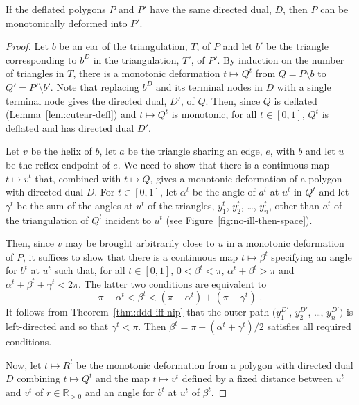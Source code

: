 \documentclass{amsart}
\newcommand{\R}[0]{\mathds{R}}
\begin{document}

\begin{theorem}
  \label{thm:defl-dd-eq}
  If the deflated polygons $P$ and $P'$ have the same directed dual,
  $D$, then $P$ can be monotonically deformed into $P'$.
\end{theorem}
\begin{proof}
  Let $b$ be an ear of the triangulation, $T$, of $P$ and let $b'$ be
  the triangle corresponding to $b^D$ in the triangulation, $T'$, of
  $P'$.  By induction on the number of triangles in $T$, there is a
  monotonic deformation $t\mapsto Q^t$ from $Q = P\setminus b$ to $Q'
  = P'\setminus b'$.  Note that replacing $b^D$ and its terminal nodes
  in $D$ with a single terminal node gives the directed dual, $D'$, of
  $Q$.  Then, since $Q$ is deflated (Lemma~\ref{lem:cutear-defl}) and
  $t\mapsto Q^t$ is monotonic, for all $t\in [0,1]$, $Q^t$ is deflated
  and has directed dual $D'$.
  
  Let $v$ be the helix of $b$, let $a$ be the triangle sharing an
  edge, $e$, with $b$ and let $u$ be the reflex endpoint of $e$.  We
  need to show that there is a continuous map $t\mapsto v^t$ that,
  combined with $t\mapsto Q$, gives a monotonic deformation of a
  polygon with directed dual $D$.  For $t\in [0,1]$, let $\alpha^t$ be
  the angle of $a^t$ at $u^t$ in $Q^t$ and let $\gamma^t$ be the sum
  of the angles at $u^t$ of the triangles, $y_1^t$, $y_2^t$, \ldots,
  $y_n^t$, other than $a^t$ of the triangulation of $Q^t$ incident to
  $u^t$ (see Figure~\ref{fig:no-ill-then-space}).
  
  Then, since $v$ may be brought arbitrarily close to $u$ in a
  monotonic deformation of $P$, it suffices to show that there is a
  continuous map $t\mapsto \beta^t$ specifying an angle for $b^t$ at
  $u^t$ such that, for all $t\in [0,1]$, $0 < \beta^t < \pi$,
  $\alpha^t + \beta^t > \pi$ and $\alpha^t + \beta^t + \gamma^t <
  2\pi$.  The latter two conditions are equivalent to
  \[
    \pi - \alpha^t < \beta^t < (\pi - \alpha^t) + (\pi - \gamma^t)\;.
  \]
  It follows from Theorem~\ref{thm:ddd-iff-nip} that the outer path
  $(y_1^{D'}$, $y_2^{D'}$, \ldots, $y_n^{D'})$ is left-directed and so
  that $\gamma^t < \pi$.  Then $\beta^t = \pi - (\alpha^t
  + \gamma^t)/2$ satisfies all required conditions.
  
  Now, let $t\mapsto R^t$ be the monotonic deformation from a polygon
  with directed dual $D$ combining $t\mapsto Q^t$ and the map
  $t\mapsto v^t$ defined by a fixed distance between $u^t$ and $v^t$
  of $r\in\R_{>0}$ and an angle for $b^t$ at $u^t$ of
  $\beta^t$.
  

\end{proof}
\end{document}
